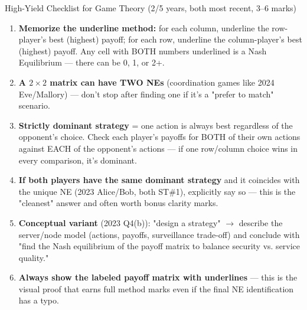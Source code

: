 \documentclass[12pt,a4paper]{article}
\begin{document}
\begin{keybox}{High-Yield Checklist for Game Theory (2/5 years, both most recent, 3--6 marks)}
\begin{enumerate}[noitemsep]
  \item \textbf{Memorize the underline method:} for each column, underline the row-player's best (highest) payoff; for each row, underline the column-player's best (highest) payoff. Any cell with BOTH numbers underlined is a Nash Equilibrium --- there can be 0, 1, or 2+.
  \item \textbf{A $2\times2$ matrix can have TWO NEs} (coordination games like 2024 Eve/Mallory) --- don't stop after finding one if it's a "prefer to match" scenario.
  \item \textbf{Strictly dominant strategy} = one action is always best regardless of the opponent's choice. Check each player's payoffs for BOTH of their own actions against EACH of the opponent's actions --- if one row/column choice wins in every comparison, it's dominant.
  \item \textbf{If both players have the same dominant strategy} and it coincides with the unique NE (2023 Alice/Bob, both ST\#1), explicitly say so --- this is the "cleanest" answer and often worth bonus clarity marks.
  \item \textbf{Conceptual variant} (2023 Q4(b)): "design a strategy" $\to$ describe the server/node model (actions, payoffs, surveillance trade-off) and conclude with "find the Nash equilibrium of the payoff matrix to balance security vs. service quality."
  \item \textbf{Always show the labeled payoff matrix with underlines} --- this is the visual proof that earns full method marks even if the final NE identification has a typo.
\end{enumerate}
\end{keybox}
\end{document}
